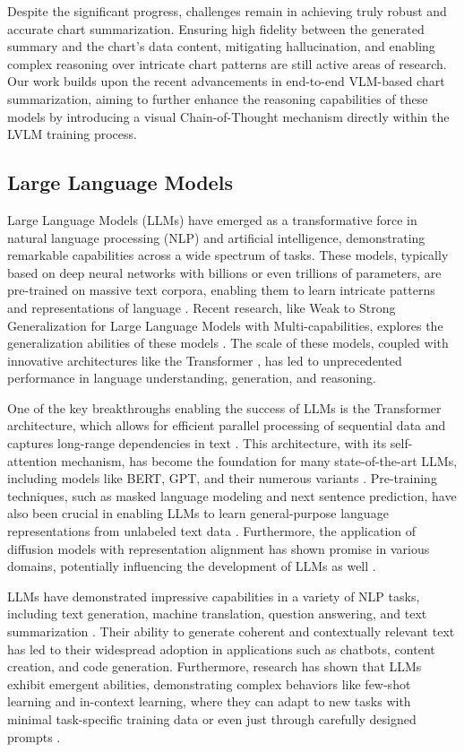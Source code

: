 Despite the significant progress, challenges remain in achieving truly robust and accurate chart summarization. Ensuring high fidelity between the generated summary and the chart's data content, mitigating hallucination, and enabling complex reasoning over intricate chart patterns are still active areas of research. Our work builds upon the recent advancements in end-to-end VLM-based chart summarization, aiming to further enhance the reasoning capabilities of these models by introducing a visual Chain-of-Thought mechanism directly within the LVLM training process.

\subsection{Large Language Models}

Large Language Models (LLMs) have emerged as a transformative force in natural language processing (NLP) and artificial intelligence, demonstrating remarkable capabilities across a wide spectrum of tasks. These models, typically based on deep neural networks with billions or even trillions of parameters, are pre-trained on massive text corpora, enabling them to learn intricate patterns and representations of language \cite{LLMTasks}.  Recent research, like Weak to Strong Generalization for Large Language Models with Multi-capabilities, explores the generalization abilities of these models \cite{zhou2025weak}. The scale of these models, coupled with innovative architectures like the Transformer \cite{Transformer}, has led to unprecedented performance in language understanding, generation, and reasoning.

One of the key breakthroughs enabling the success of LLMs is the Transformer architecture, which allows for efficient parallel processing of sequential data and captures long-range dependencies in text \cite{Transformer}. This architecture, with its self-attention mechanism, has become the foundation for many state-of-the-art LLMs, including models like BERT, GPT, and their numerous variants \cite{BERT,GPT}.  Pre-training techniques, such as masked language modeling and next sentence prediction, have also been crucial in enabling LLMs to learn general-purpose language representations from unlabeled text data \cite{BERT}.  Furthermore, the application of diffusion models with representation alignment has shown promise in various domains, potentially influencing the development of LLMs as well \cite{wang2024diffusion}.

LLMs have demonstrated impressive capabilities in a variety of NLP tasks, including text generation, machine translation, question answering, and text summarization \cite{LLMTasks}. Their ability to generate coherent and contextually relevant text has led to their widespread adoption in applications such as chatbots, content creation, and code generation. Furthermore, research has shown that LLMs exhibit emergent abilities, demonstrating complex behaviors like few-shot learning and in-context learning, where they can adapt to new tasks with minimal task-specific training data or even just through carefully designed prompts \cite{EmergentAbilities}.


